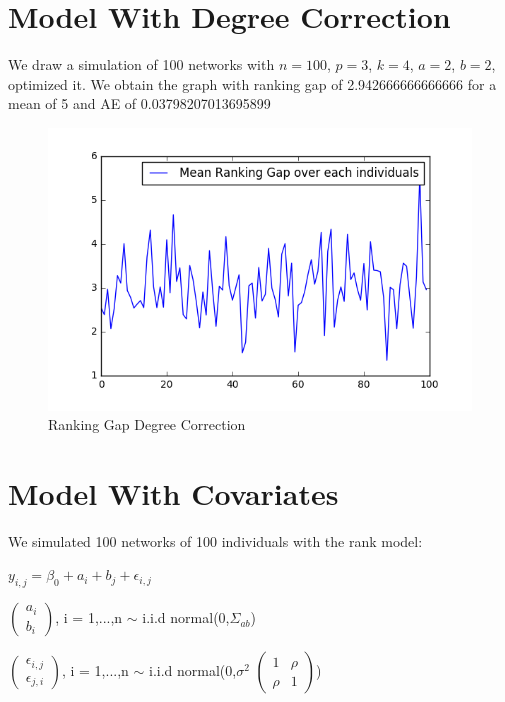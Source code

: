 \documentclass[12pt]{ociamthesis}  %
\begin{document}
	\section{Model With Degree Correction}
	
	We draw a simulation of 100 networks with $n = 100$, $ p = 3$, $k = 4$, $a = 2$, $b = 2$, optimized it. We obtain the graph with ranking gap of 2.942666666666666 for a mean of 5 and AE of 0.03798207013695899
	
	\begin{figure}[H]
		\centering
		\includegraphics[width=\textwidth,height=\textheight,keepaspectratio]{SimulationGapDegreeCorr}
		\caption{Ranking Gap Degree Correction}
		\label{label-image14}
	\end{figure}
	
	
	\section{Model With Covariates}
	
	We simulated 100 networks of 100 individuals with the rank model:
	
	$y_{i,j} = \beta_{0} + a_{i} + b_{j} + \epsilon_{i,j}$
	
	
	\(
	\begin{pmatrix}
	a_{i} \\
	b_{i}
	\end{pmatrix}
	\), i = 1,...,n $\sim $ i.i.d normal(0,$\Sigma_{ab}$)
	
	\(
	\begin{pmatrix}
	\epsilon_{i,j} \\
	\epsilon_{j,i}
	\end{pmatrix}
	\), i = 1,...,n $\sim $ i.i.d normal(0,$\sigma^{2}$ $\begin{pmatrix} 1 & \rho \\ \rho & 1 \end{pmatrix}$)
	
\end{document}
